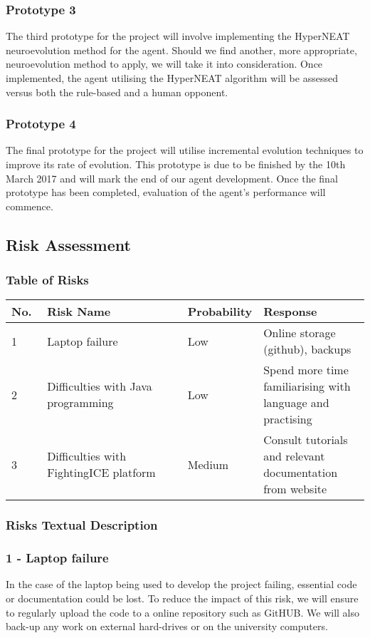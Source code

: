 \documentclass[12pt,a4paper]{article}
\begin{document}
\subsubsection*{Prototype 3}
The third prototype for the project will involve implementing the HyperNEAT neuroevolution method for the agent. Should we find another, more appropriate, neuroevolution method to apply, we will take it into consideration. Once implemented, the agent utilising the HyperNEAT algorithm will be assessed versus both the rule-based and a human opponent.

\subsubsection*{Prototype 4}
The final prototype for the project will utilise incremental evolution techniques to improve its rate of evolution. This prototype is due to be finished by the 10th March 2017 and will mark the end of our agent development. Once the final prototype has been completed, evaluation of the agent's performance will commence.
\newpage
\subsection{Risk Assessment}
\subsubsection{Table of Risks}
\begin{tabular}{|p{0.1\linewidth}|p{0.4\linewidth}|p{0.2\linewidth}|p{0.3\linewidth}|}
\hline
No. & Risk Name & Probability & Response\\ \hline
1 & Laptop failure & Low & Online storage (github), backups\\ \hline
2 & Difficulties with Java programming & Low & Spend more time familiarising with language and practising\\ \hline
3 & Difficulties with FightingICE platform & Medium & Consult tutorials and relevant documentation from website\\ \hline
\end{tabular}
\subsubsection{Risks Textual Description}
\subsubsection*{1 - Laptop failure}
In the case of the laptop being used to develop the project failing, essential code or documentation could be lost. To reduce the impact of this risk, we will ensure to regularly upload the code to a online repository such as GitHUB. We will also back-up any work on external hard-drives or on the university computers.
\end{document}
